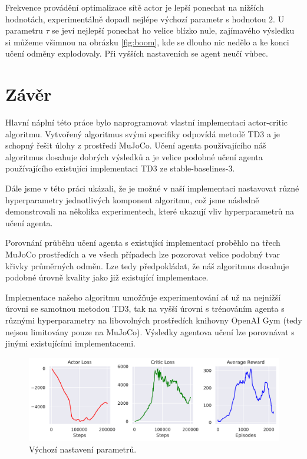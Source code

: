     Frekvence provádění optimalizace sítě actor je lepší ponechat na nižších hodnotách, experimentálně dopadl nejlépe výchozí parametr s hodnotou $2$. U parametru $\tau$ se jeví nejlepší ponechat ho velice blízko nule, zajímavého výsledku si můžeme všimnou na obrázku \ref{fig:boom}, kde se dlouho nic nedělo a ke konci učení odměny explodovaly. Při vyšších nastaveních se agent neučí vůbec.





\section{Závěr}
\label{sec:Conclusions}

Hlavní náplní této práce bylo naprogramovat vlastní implementaci actor-critic algoritmu. Vytvořený algoritmus svými specifiky odpovídá metodě TD3 a je schopný řešit úlohy z prostředí MuJoCo. Učení agenta používajícího náš algoritmus dosahuje dobrých výsledků a je velice podobné učení agenta používajícího existující implementaci TD3 ze stable-baselines-3. 

Dále jsme v této práci ukázali, že je možné v naší implementaci nastavovat různé hyperparametry jednotlivých komponent algoritmu, což jsme následně demonstrovali na několika experimentech, které ukazují vliv hyperparametrů na učení agenta.

Porovnání průběhu učení agenta s existující implementací proběhlo na třech MuJoCo prostředích a ve všech případech lze pozorovat velice podobný tvar křivky průměrných odměn. Lze tedy předpokládat, že náš algoritmus dosahuje podobné úrovně kvality jako již existující implementace.

Implementace našeho algoritmu umožňuje experimentování ať už na nejnižší úrovni se samotnou metodou TD3, tak na vyšší úrovni s trénováním agenta s různými hyperparametry na libovolných prostředích knihovny OpenAI Gym (tedy nejsou limitovány pouze na MuJoCo). Výsledky agentova učení lze porovnávat s jinými existujícími implementacemi.

\begin{figure}[ht]
  \centering
  \includegraphics[width=\linewidth]{images/exp-hopper-default.pdf}
  \caption{Výchozí nastavení parametrů.}
  \label{fig:default}
\end{figure}


